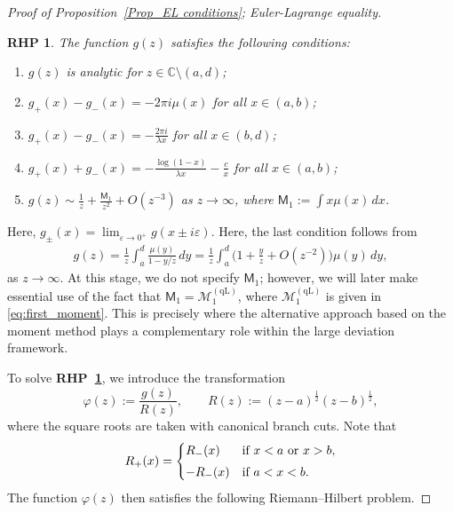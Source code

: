 \documentclass{amsart}
\newcommand{\pv}{\operatorname{p.v.}}
\theoremstyle{plain}
\newtheorem{rhp}{RHP}[section]
\theoremstyle{remark}
\numberwithin{equation}{section}
\begin{document}
\begin{proof}[Proof of Proposition~\ref{Prop_EL conditions}; Euler-Lagrange equality]
\begin{rhp}
\label{rhp:little_g}
    The function $g(z)$ satisfies the following conditions: 
    \begin{enumerate}
        \item $g(z)$ is analytic for $z\in \mathbb{C}\setminus(a,d)$;
        \smallskip 
        \item \label{item:recovery_formula} $\displaystyle g_+(x)-g_-(x) = -2\pi i \mu(x)$ for all $x\in(a,b)$;
        \smallskip 
        \item $\displaystyle g_+(x)-g_-(x) = -\frac{2\pi i}{\lambda x}$ for all $x\in(b,d)$;
        \smallskip 
        \item $\displaystyle g_+(x)+g_-(x) %
        = - \frac{\log(1-x)}{\lambda x}-\frac{c}{x} $ for all $x\in(a,b)$;
        \smallskip 
        \item $\displaystyle g(z) \sim \frac{1}{z} + \frac{ \mathsf{M}_1 }{z^2} + O(z^{-3})$ as $z \to \infty$, where $\mathsf{M}_1:= \int x \mu(x)\,dx$. 
    \end{enumerate}
\end{rhp}
Here, $g_\pm(x) = \lim_{\varepsilon\to0^+} g(x\pm i\varepsilon)$. Here, the last condition follows from 
\begin{align*}
g(z) = \frac{1}{z}\int_a^d  \frac{\mu(y)}{1-y/z}\,dy = \frac{1}{z} \int_a^d \Big( 1+\frac{y}{z} +O(z^{-2}) \Big)\mu(y)\,dy,
\end{align*}
as $z \to \infty.$ At this stage, we do not specify $\mathsf{M}_1$; however, we will later make essential use of the fact that $\mathsf{M}_1=\mathcal{M}_1^{(\mathrm{qL})}$, where $\mathcal{M}_1^{(\mathrm{qL})}$ is given in
\eqref{eq:first_moment}. This is precisely where the alternative approach based on the moment method plays a complementary role within the large deviation framework.


To solve \textbf{RHP~\ref{rhp:little_g}}, we introduce the transformation
\begin{equation}
\varphi(z):= \frac{g(z)}{R(z)}, \qquad    R(z) := (z-a)^{\frac{1}{2}}(z-b)^{\frac{1}{2}},
\end{equation}
where the square roots are taken with canonical branch cuts. 
Note that 
\begin{equation} \label{jump of R pm}
R_+(x) = \begin{cases}
 R_-(x) &\textup{if } x <a \textup{ or } x>b, 
 \smallskip 
 \\
 -R_-(x) &\textup{if } a<x<b. 
\end{cases} 
\end{equation}
The function
$\varphi(z)$ then satisfies the following Riemann--Hilbert problem.


\end{proof}
\end{document}
